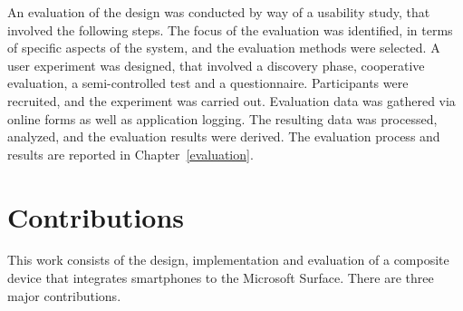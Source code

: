 An evaluation of the design was conducted by way of a usability study, that involved the following steps.
The focus of the evaluation was identified, in terms of specific aspects of the system, and the evaluation methods were selected.
A user experiment was designed, that involved a discovery phase, cooperative evaluation, a semi-controlled test and a questionnaire.
Participants were recruited, and the experiment was carried out.
Evaluation data was gathered via online forms as well as application logging.
The resulting data was processed, analyzed, and the evaluation results were derived.
The evaluation process and results are reported in Chapter~\ref{evaluation}.

\section{Contributions}

This work consists of the design, implementation and evaluation of a composite device that integrates smartphones to the Microsoft Surface.
There are three major contributions.


